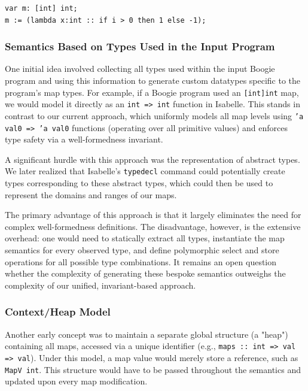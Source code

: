 \documentclass[11pt]{article}
\begin{document}
\begin{verbatim}
var m: [int] int;
m := (lambda x:int :: if i > 0 then 1 else -1);
\end{verbatim}


\subsubsection{Semantics Based on Types Used in the Input Program}

One initial idea involved collecting all types used within the input Boogie program
and using this information to generate custom datatypes specific to the program's map types.
For example, if a Boogie program used an \texttt{[int]int} map, we would model it directly as an \texttt{int => int} function in Isabelle.
This stands in contrast to our current approach, which uniformly models all map levels using \texttt{'a val0 => 'a val0} functions
(operating over all primitive values) and enforces type safety via a well-formedness invariant.

A significant hurdle with this approach was the representation of abstract types.
We later realized that Isabelle's \texttt{typedecl} command could potentially create types corresponding to these abstract types,
which could then be used to represent the domains and ranges of our maps.

The primary advantage of this approach is that it largely eliminates the need for complex well-formedness definitions.
The disadvantage, however, is the extensive overhead: one would need to statically extract all types, instantiate the map semantics for every observed type, and define polymorphic select and store operations for all possible type combinations. It remains an open question whether the complexity of generating these bespoke semantics outweighs the complexity of our unified, invariant-based approach.

\subsubsection{Context/Heap Model}

Another early concept was to maintain a separate global structure (a "heap") containing all maps,
accessed via a unique identifier (e.g., \texttt{maps :: int => val => val}).
Under this model, a map value would merely store a reference, such as \texttt{MapV int}.
This structure would have to be passed throughout the semantics and updated upon every map modification.
\end{document}
